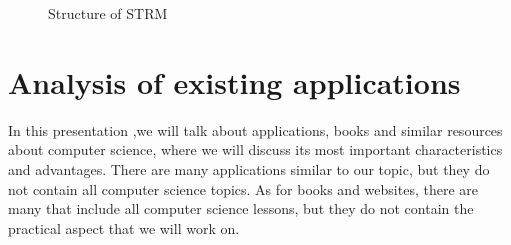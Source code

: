\begin{figure} [h!]%
 	\vspace*{13pt}
 	\vspace*{13pt}               
 	\caption{Structure of STRM} 
 	\label{fig:STRM}
 \end{figure} 


 \section{Analysis of existing applications}
 In this presentation ,we will talk about applications, books and similar resources about computer science, 
 where we will discuss its most important characteristics and advantages.
 There are many applications similar to our topic, but they do not contain all computer science topics.
 As for books and websites, there are many that include all computer science lessons, but they do not 
 contain the practical aspect that we will work on.
 
